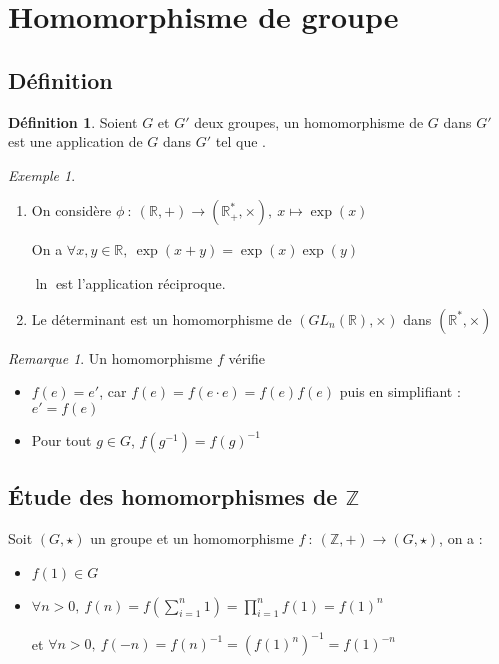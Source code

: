 \documentclass[]{article}
\theoremstyle{remark}
\newtheorem{myrem}{Remarque}
\newtheorem{myexmpl}{Exemple}
\theoremstyle{definition}
\newtheorem{mydef}{Définition}
\newcommand{\funcinline}[5]{
#1 ~ : ~ #2 \longrightarrow #3, ~ #4 \longmapsto #5
}
\newcommand{\funcshort}[3]{
#1 ~ : ~ #2 \longrightarrow #3
}
\begin{document}
\section{Homomorphisme de groupe}

\subsection{Définition}

\begin{mydef}
	Soient $G$ et $G'$ deux groupes, un homomorphisme de $G$ dans $G'$ est une application de $G$ dans $G'$ tel que .
\end{mydef}

\begin{myexmpl}
	\leavevmode
	\begin{enumerate}
		\item On considère $\funcinline{\phi}{(\mathbb{R}, +)}{(\mathbb{R}^*_+, \times)}{x}{\exp(x)}$
		
		On a $\forall x, y \in \mathbb{R}, ~ \exp(x+y)=\exp(x)\exp(y)$
		
		$\ln$ est l'application réciproque.
		
		\item Le déterminant est un homomorphisme de $(GL_n(\mathbb{R}), \times)$ dans $(\mathbb{R}^*, \times)$
	\end{enumerate}
\end{myexmpl}

\begin{myrem}
	Un homomorphisme $f$ vérifie 
	\begin{itemize}
		\item $f(e)=e'$, car $f(e)=f(e \cdot e)=f(e)f(e)$ puis en simplifiant : $e' = f(e)$
		\item Pour tout $g \in G$, $f(g^{-1})=f(g)^{-1}$
	\end{itemize}
\end{myrem}

\subsection{Étude des homomorphismes de $\mathbb{Z}$}

Soit $(G, \star)$ un groupe et un homomorphisme  $\funcshort{f}{(\mathbb{Z}, +)}{(G, \star)}$, on a :
\begin{itemize}
	\item $f(1) \in G$
	\item $\displaystyle \forall n > 0, ~ f(n) = f\left(\sum_{i=1}^{n} 1\right) = \prod_{i=1}^{n} f(1) = f(1)^n$
	
	et $\displaystyle \forall n > 0, ~ f(-n) = f(n)^{-1} = \left(f(1)^n\right)^{-1} = f(1)^{-n}$
\end{itemize}
\end{document}
